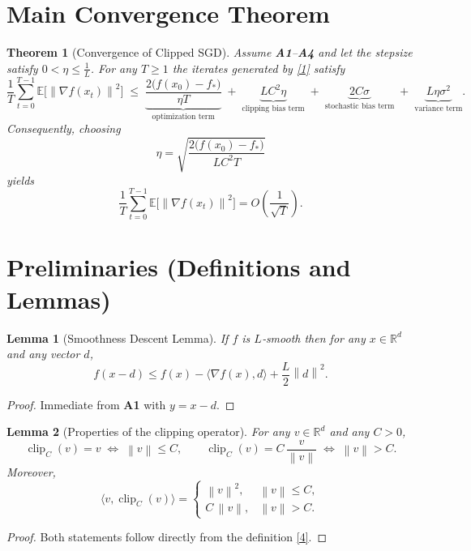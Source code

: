 \documentclass{article}
\newtheorem{theorem}{Theorem}
\newtheorem{lemma}{Lemma}
\newcommand{\norm}[1]{\left\lVert#1\right\rVert}
\newcommand{\E}{\mathbb{E}}
\begin{document}
\section*{Main Convergence Theorem}
\begin{theorem}[Convergence of Clipped SGD]\label{thm:main}
Assume \textbf{A1}–\textbf{A4} and let the stepsize satisfy
$0<\eta\le \tfrac{1}{L}$.  For any $T\ge1$ the iterates generated by
\eqref{1} satisfy
\[
\frac{1}{T}\sum_{t=0}^{T-1}\E\!\bigl[\norm{\nabla f(x_{t})}^{2}\bigr]
\;\le\;
\underbrace{\frac{2\bigl(f(x_{0})-f_{*}\bigr)}{\eta T}}_{\displaystyle\text{optimization term}}
\;+\;
\underbrace{L C^{2}\eta}_{\displaystyle\text{clipping bias term}}
\;+\;
\underbrace{2C\sigma}_{\displaystyle\text{stochastic bias term}}
\;+\;
\underbrace{L\eta\sigma^{2}}_{\displaystyle\text{variance term}} .
\tag{2}
\]
Consequently, choosing
\[
\eta = \sqrt{\frac{2\bigl(f(x_{0})-f_{*}\bigr)}{L C^{2}T}}
\]
yields
\[
\frac{1}{T}\sum_{t=0}^{T-1}\E\!\bigl[\norm{\nabla f(x_{t})}^{2}\bigr]
= O\!\left(\frac{1}{\sqrt{T}}\right) .
\]
\end{theorem}

\section*{Preliminaries (Definitions and Lemmas)}
\begin{lemma}[Smoothness Descent Lemma]\label{lem:smooth}
If $f$ is $L$‑smooth then for any $x\in\mathbb{R}^{d}$ and any vector $d$,
\[
f(x-d)\le f(x)-\langle\nabla f(x),d\rangle+\frac{L}{2}\norm{d}^{2}.
\tag{3}
\]
\end{lemma}
\begin{proof}
Immediate from \textbf{A1} with $y=x-d$.
\end{proof}

\begin{lemma}[Properties of the clipping operator]\label{lem:clip}
For any $v\in\mathbb{R}^{d}$ and any $C>0$,
\[
\operatorname{clip}_{C}(v)=v\;\Longleftrightarrow\;\norm{v}\le C,
\qquad
\operatorname{clip}_{C}(v)=C\,\frac{v}{\norm{v}}\;\Longleftrightarrow\;\norm{v}>C .
\tag{4}
\]
Moreover,
\[
\langle v,\operatorname{clip}_{C}(v)\rangle
=
\begin{cases}
\norm{v}^{2}, & \norm{v}\le C,\\[4pt]
C\,\norm{v}, & \norm{v}> C .
\end{cases}
\tag{5}
\]
\end{lemma}
\begin{proof}
Both statements follow directly from the definition \eqref{4}.
\end{proof}
\end{document}
